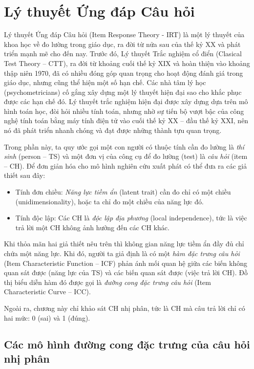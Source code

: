 \section{Lý thuyết Ứng đáp Câu hỏi}
Lý thuyết Ứng đáp Câu hỏi (Item Response Theory - IRT) là một lý thuyết của khoa học về đo lường trong giáo dục, ra đời từ nửa sau của thế kỷ XX và phát triển mạnh mẽ cho đến nay. Trước đó, Lý thuyết Trắc nghiệm cổ điển (Clasical Test Theory – CTT), ra đời từ khoảng cuối thế kỷ XIX và hoàn thiện vào khoảng thập niên 1970, đã có nhiều đóng góp quan trọng cho hoạt động đánh giá trong giáo dục, nhưng cũng thể hiện một số hạn chế. Các nhà tâm lý học (psychometricians) cố gắng xây dựng một lý thuyết hiện đại sao cho khắc phục được các hạn chế đó. Lý thuyết trắc nghiệm hiện đại được xây dựng dựa trên mô hình toán học, đòi hỏi nhiều tính toán, nhưng nhờ sự tiến bộ vượt bậc của công nghệ tính toán bằng máy tính điện tử vào cuối thế kỷ XX – đầu thế kỷ XXI, nên nó đã phát triển nhanh chóng và đạt được những thành tựu quan trọng.\par
Trong phần này, ta quy ước gọi một con người có thuộc tính cần đo lường là \textit{thí sinh} (person – TS) và một đơn vị của công cụ để đo lường (test) là \textit{câu hỏi} (item – CH). Để đơn giản hóa cho mô hình nghiên cứu xuất phát có thể đưa ra các giả thiết sau đây:\par
\begin{itemize}
	\item Tính đơn chiều: \textit{Năng lực tiềm ẩn} (latent trait) cần đo chỉ có một chiều (unidimensionality), hoặc ta chỉ đo một chiều của năng lực đó.
	\item Tính độc lập: Các CH là \textit{độc lập địa phương} (local independence), tức là việc trả lời một CH không ảnh hưởng đến các CH khác.
\end{itemize}\par
Khi thỏa mãn hai giả thiết nêu trên thì không gian năng lực tiềm ẩn đầy đủ chỉ chứa một năng lực. Khi đó, người ta giả định là có một \textit{hàm đặc trưng câu hỏi} (Item Characteristic Function – ICF) phản ánh mối quan hệ giữa các biến không quan sát được (năng lực của TS) và các biến quan sát được (việc trả lời CH). Đồ thị biểu diễn hàm đó được gọi là \textit{đường cong đặc trưng câu hỏi} (Item Characteristic Curve – ICC).\par
Ngoài ra, chương này chỉ khảo sát CH nhị phân, tức là CH mà câu trả lời chỉ có hai mức: 0 (sai) và 1 (đúng).\par

\subsection{Các mô hình đường cong đặc trưng của câu hỏi nhị phân}
